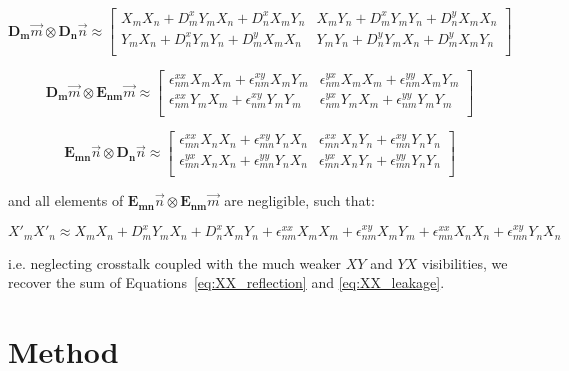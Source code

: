 \documentclass[10pt,a4paper,notitlepage]{article}
\begin{document}
\begin{equation}
\boldsymbol{D_m}\vec{m} \otimes \boldsymbol{D_n}\vec{n}
\approx
\begin{bmatrix}
X_mX_n + D^x_mY_mX_n + D^x_nX_mY_n    &    X_mY_n + D^x_mY_mY_n + D^y_nX_mX_n \\
Y_mX_n + D^x_nY_mY_n + D^y_mX_mX_n    &    Y_mY_n + D^y_nY_mX_n  + D^y_mX_mY_n \\
\end{bmatrix}
\end{equation}

\begin{equation}
\boldsymbol{D_m}\vec{m} \otimes \boldsymbol{E_{nm}}\vec{m}
\approx
\begin{bmatrix}
\epsilon^{xx}_{nm}X_mX_m + \epsilon^{xy}_{nm}X_mY_m & \epsilon^{yx}_{nm}X_mX_m + \epsilon^{yy}_{nm}X_mY_m  \\
\epsilon^{xx}_{nm}Y_mX_m + \epsilon^{xy}_{nm}Y_mY_m  & \epsilon^{yx}_{nm}Y_mX_m + \epsilon^{yy}_{nm}Y_mY_m   \\
\end{bmatrix}
\end{equation}

\begin{equation}
\boldsymbol{E_{mn}}\vec{n} \otimes \boldsymbol{D_n}\vec{n}
\approx
\begin{bmatrix}
\epsilon^{xx}_{mn}X_nX_n + \epsilon^{xy}_{mn}Y_nX_n    &    \epsilon^{xx}_{mn}X_nY_n + \epsilon^{xy}_{mn}Y_nY_n \\
\epsilon^{yx}_{mn}X_nX_n + \epsilon^{yy}_{mn}Y_nX_n    &    \epsilon^{yx}_{mn}X_nY_n + \epsilon^{yy}_{mn}Y_nY_n \\
\end{bmatrix}
\end{equation}

\noindent and all elements of $\boldsymbol{E_{mn}}\vec{n} \otimes \boldsymbol{E_{nm}}\vec{m}$ are negligible, such that:

\begin{equation}
X'_mX'_n \approx X_mX_n + D^x_mY_mX_n + D^x_nX_mY_n + \epsilon^{xx}_{nm}X_mX_m + \epsilon^{xy}_{nm}X_mY_m + \epsilon^{xx}_{mn}X_nX_n + \epsilon^{xy}_{mn}Y_nX_n 
\end{equation}

\noindent i.e. neglecting crosstalk coupled with the much weaker $XY$ and $YX$ visibilities, we recover the sum of Equations~\ref{eq:XX_reflection} and \ref{eq:XX_leakage}.

\section{Method}
\label{sec:method}
\end{document}
